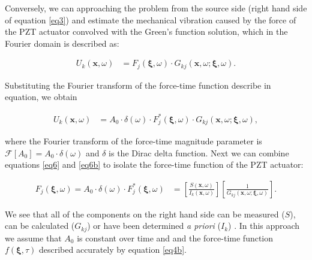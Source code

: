 \documentclass[preprint,3p, 11pt,authoryear]{elsarticle}
\begin{document}
Conversely, we can approaching the problem from the source side (right hand side of equation \eqref{eq3}) and estimate the mechanical vibration caused by the force of the PZT actuator convolved with the Green's function solution, which in the Fourier domain is described as:

\begin{equation}
    \label{eq6a}
\begin{split}
U_{k}\left( \mathbf{x}, \omega \right) & = 
       F_{j}\left( \mathbf{\xi}, \omega \right)  \cdot G_{kj}\left(  \mathbf{x}, \omega; \mathbf{\xi}, \omega\right).
\end{split}
\end{equation}

\noindent Substituting the Fourier transform of the force-time function describe in equation, we obtain

\begin{equation}
    \label{eq6b}
\begin{split}
U_{k}\left( \mathbf{x}, \omega \right) & = 
       A_{0}\cdot \delta (\omega)\cdot F^{*}_{j}\left( \mathbf{\xi}, \omega \right)  \cdot G_{kj}\left(  \mathbf{x}, \omega; \mathbf{\xi}, \omega\right),
\end{split}
\end{equation}

\noindent where the Fourier transform of the force-time magnitude parameter is $\mathcal{F}[A_{0}] = A_{0}\cdot\delta(\omega)$ and $\delta$ is the Dirac delta function.  Next we can combine equations \eqref{eq6} and \eqref{eq6b} to isolate the force-time function of the PZT actuator:


\begin{equation}
    \label{eq6c}
\begin{split}
 F_{j}\left( \mathbf{\xi}, \omega \right) = A_{0}\cdot \delta (\omega)  \cdot F^{*}_{j}\left( \mathbf{\xi}, \omega \right) & 
=\left[ \frac{S\left( \mathbf{x}, \omega \right) } 
{ I_{k}\left( \mathbf{x},\omega \right)} \right]
\left[ \frac{1}{ G_{kj}\left(  \mathbf{x}, \omega; \mathbf{\xi}, \omega\right)} \right].
\end{split}
\end{equation}

\noindent We see that all of the components on the right hand side can be measured ($S$), can be calculated ($G_{kj}$) or have been determined \textit{a priori} ($I_{k}$) . In this approach we assume that $A_{0}$ is constant over time and and the force-time function $f(\mathbf{\xi}, \tau)$ described accurately by equation \eqref{eq4b}.
\end{document}
